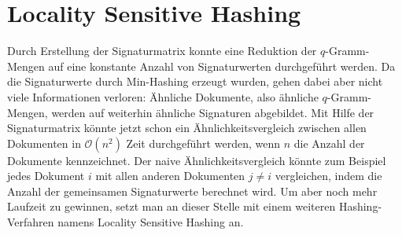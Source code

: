 \section{Locality Sensitive Hashing}
\label{sec:hash:lsh}
Durch Erstellung der Signaturmatrix konnte eine Reduktion der $q$-Gramm-Mengen auf eine konstante Anzahl von Signaturwerten durchgeführt werden.
Da die Signaturwerte durch Min-Hashing erzeugt wurden, gehen dabei aber nicht viele Informationen verloren: Ähnliche Dokumente, also ähnliche $q$-Gramm-Mengen, werden auf weiterhin ähnliche Signaturen abgebildet.
Mit Hilfe der Signaturmatrix könnte jetzt schon ein Ähnlichkeitsvergleich zwischen allen Dokumenten in $\mathcal{O}(n^2)$ Zeit durchgeführt werden, wenn $n$ die Anzahl der Dokumente kennzeichnet.
Der naive Ähnlichkeitsvergleich könnte zum Beispiel jedes Dokument $i$ mit allen anderen Dokumenten $j \neq i$ vergleichen, indem die Anzahl der gemeinsamen Signaturwerte berechnet wird.
Um aber noch mehr Laufzeit zu gewinnen, setzt man an dieser Stelle mit einem weiteren Hashing-Verfahren namens Locality Sensitive Hashing an.

